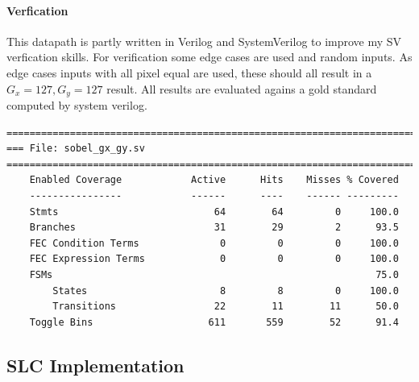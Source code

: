 \documentclass[a4paper,fontsize=12pt]{scrartcl}
\begin{document}
\paragraph{Verfication}

This datapath is partly written in Verilog and SystemVerilog to improve my SV verfication skills. For verification some edge cases are used and random inputs. As edge cases inputs with all pixel equal are used, these should all result in a $G_x = 127, G_y = 127$ result. All results are evaluated agains a gold standard computed by system verilog.

\pagebreak

\begin{lstlisting}
=================================================================================
=== File: sobel_gx_gy.sv
=================================================================================
    Enabled Coverage            Active      Hits    Misses % Covered
    ----------------            ------      ----    ------ ---------
    Stmts                           64        64         0     100.0
    Branches                        31        29         2      93.5
    FEC Condition Terms              0         0         0     100.0
    FEC Expression Terms             0         0         0     100.0
    FSMs                                                        75.0
        States                       8         8         0     100.0
        Transitions                 22        11        11      50.0
    Toggle Bins                    611       559        52      91.4
\end{lstlisting}

\subsection{SLC Implementation}
\end{document}
